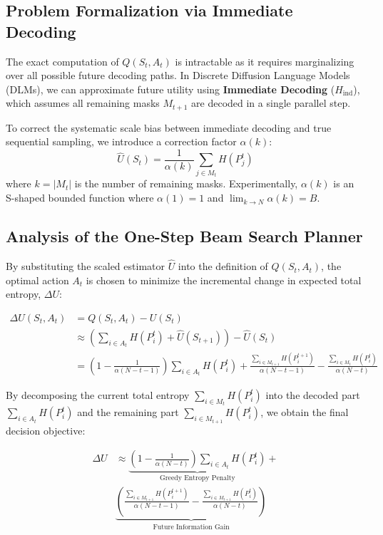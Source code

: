 \subsection{Problem Formalization via Immediate Decoding}
The exact computation of $Q(S_t, A_t)$ is intractable as it requires marginalizing over all possible future decoding paths. In Discrete Diffusion Language Models (DLMs), we can approximate future utility using \textbf{Immediate Decoding} ($H_{\text{ind}}$), which assumes all remaining masks $M_{t+1}$ are decoded in a single parallel step.

To correct the systematic scale bias between immediate decoding and true sequential sampling, we introduce a correction factor $\alpha(k)$:
\begin{equation}
    \hat{U}(S_t) = \frac{1}{\alpha(k)} \sum_{j \in M_t} H(P_j^t)
\end{equation}
where $k = |M_t|$ is the number of remaining masks. Experimentally, $\alpha(k)$ is an S-shaped bounded function where $\alpha(1)=1$ and $\lim_{k \to N} \alpha(k) = B$.

\subsection{Analysis of the One-Step Beam Search Planner}
By substituting the scaled estimator $\hat{U}$ into the definition of $Q(S_t, A_t)$, the optimal action $A_t$ is chosen to minimize the incremental change in expected total entropy, $\Delta U$:

\begin{equation}
\begin{aligned}
    \Delta U(S_t, A_t) &= Q(S_t, A_t) - U(S_t) \\
    &\approx \left( \sum_{i \in A_t} H(P_i^t) + \hat{U}(S_{t+1}) \right) - \hat{U}(S_t) \\
    &= (1-\frac{1}{\alpha(N-t-1)})\sum_{i \in A_t} H(P_i^t) + \frac{\sum_{i \in M_{t+1}} H(P_i^{t+1})}{\alpha(N-t-1)} - \frac{\sum_{i \in M_t} H(P_i^t)}{\alpha(N-t)}
\end{aligned}
\end{equation}

By decomposing the current total entropy $\sum_{i \in M_t} H(P_i^t)$ into the decoded part $\sum_{i \in A_t} H(P_i^t)$ and the remaining part $\sum_{i \in M_{t+1}} H(P_i^t)$, we obtain the final decision objective:

\begin{align}
    \Delta U &\approx \underbrace{\left( 1 - \frac{1}{\alpha(N-t)} \right) \sum_{i \in A_t} H(P_i^t)}_{\text{Greedy Entropy Penalty}} +\\ &\underbrace{\left( \frac{\sum_{i \in M_{t+1}} H(P_i^{t+1})}{\alpha(N-t-1)} - \frac{\sum_{i \in M_{t+1}} H(P_i^t)}{\alpha(N-t)} \right)}_{\text{Future Information Gain}}
\end{align}

